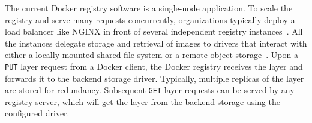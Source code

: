 The current Docker registry software is a single-node application.
%
To scale the registry and serve many requests concurrently, organizations typically deploy a load
balancer like NGINX in front of several independent registry
instances~\cite{dockerworkload, anwar-cloud19}.
%
All the instances delegate storage and retrieval of images to drivers that interact with
either a locally mounted shared file system or a remote object storage~\cite{s3,azure,swift,aliyun}.
%
%
Upon a \texttt{PUT} layer request from a Docker client, the Docker registry receives the layer and forwards it to the
backend storage driver.
%
Typically, multiple replicas of the layer are stored for redundancy.
%
Subsequent \texttt{GET} layer requests can be served by any registry server,
which will get the layer from the backend storage using the configured driver.

%


%
%
%
%
%
%
%
